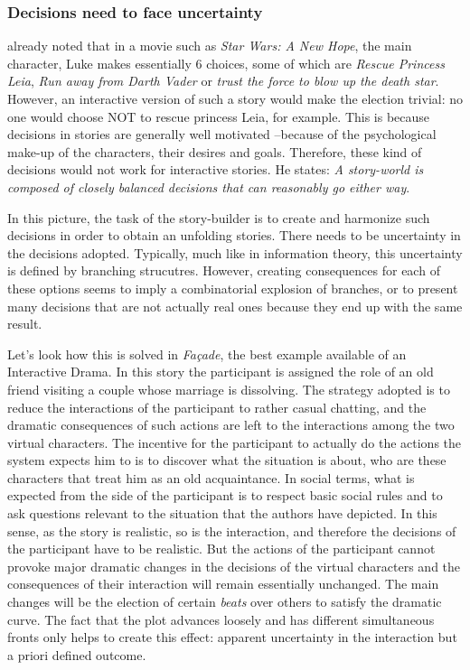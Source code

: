 \documentclass[
		twoside,openright,titlepage,numbers=noenddot,manychapters,
		headinclude,%
                footinclude=false,cleardoublepage=empty,
                BCOR=5mm,
		fontsize=11pt, %
                 enabledeprecatedfontcommands]{scrreprt}
\begin{document}
\subsubsection{Decisions need to face uncertainty}

 \cite{crawford2004cci} %
already noted that in  a movie such as \emph{Star Wars: A New Hope}, the main character, Luke makes essentially 6 choices, some of which are \emph{Rescue Princess Leia}, \emph{Run away from Darth Vader} or \emph{trust the force to blow up the death star}. However, an interactive version of such a story would make the election trivial: no one would choose NOT to rescue princess Leia, for example. This is because decisions in stories are generally well motivated --because of the psychological make-up of the characters, their desires and goals. Therefore, these kind of decisions would not work for interactive stories. He states: \emph{A story-world is composed of closely balanced decisions that can reasonably go either way}. 

In this picture, the task of the story-builder is to create and harmonize such decisions in order to obtain an unfolding stories. There needs to be uncertainty in the decisions adopted. Typically, much like in information theory, this uncertainty is defined by branching strucutres. However, creating consequences for each of these options seems to imply a combinatorial explosion of branches, or to present many decisions that are not actually real ones because they end up with the same result.

Let's look how this is solved in  \emph{Façade}, the best example available of an Interactive Drama. In this story the participant is assigned the role of an old friend visiting a couple whose marriage is dissolving. The strategy adopted is to reduce the interactions of the participant to rather casual chatting, and the dramatic consequences of such actions are left to the interactions among the two virtual characters. The incentive for the participant to actually do the actions the system expects him to is to discover what the situation is about, who are these characters that treat him as an old acquaintance. In social terms, what is expected from the side of the participant is to respect basic social rules and to ask questions relevant to the situation that the authors have depicted. In this sense, as the story is realistic, so is the interaction, and therefore the decisions of the participant have to be realistic. But the actions of the participant cannot provoke major dramatic changes in the decisions of the virtual characters and the consequences of their interaction will remain essentially unchanged. The main changes will be the election of certain \emph{beats} over others to satisfy the dramatic curve.  The fact that the plot advances loosely and has different simultaneous fronts only helps to create this effect: apparent uncertainty in the interaction but a priori defined outcome.
\end{document}
